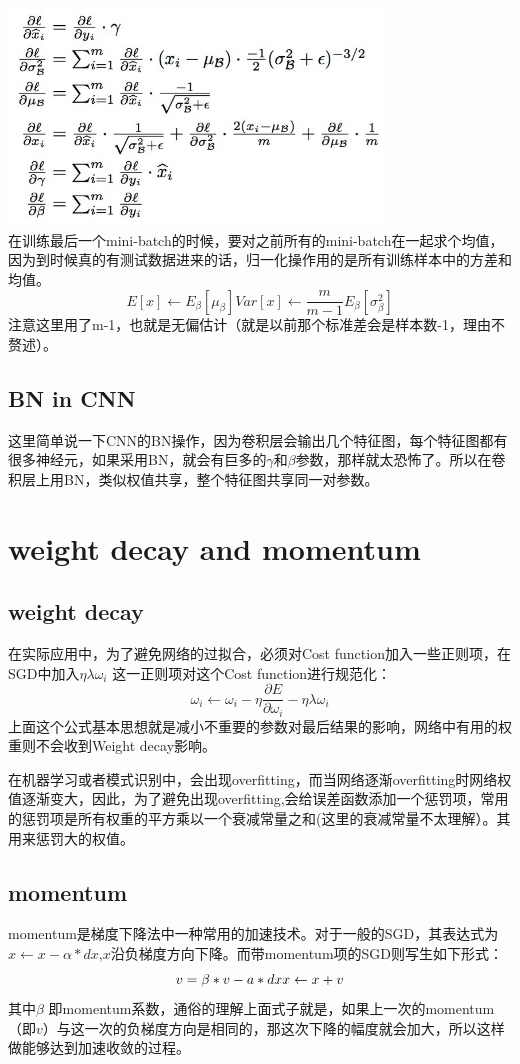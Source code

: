 \documentclass{article}
\begin{document}
\includegraphics[width=10cm]{chain}\\
在训练最后一个mini-batch的时候，要对之前所有的mini-batch在一起求个均值，因为到时候真的有测试数据进来的话，归一化操作用的是所有训练样本中的方差和均值。
$$
E[x] \leftarrow E_{\beta}[\mu_{\beta}]
Var[x] \leftarrow \frac{m}{m-1}E_{\beta}[\sigma^{2}_{\beta}]
$$
注意这里用了m-1，也就是无偏估计（就是以前那个标准差会是样本数-1，理由不赘述）。

\subsection{BN in CNN}
这里简单说一下CNN的BN操作，因为卷积层会输出几个特征图，每个特征图都有很多神经元，如果采用BN，就会有巨多的$\gamma$和$\beta$参数，那样就太恐怖了。所以在卷积层上用BN，类似权值共享，整个特征图共享同一对参数。


\section{weight decay and momentum}
\subsection{weight decay}
在实际应用中，为了避免网络的过拟合，必须对Cost function加入一些正则项，在SGD中加入$\eta \lambda \omega _{i}$ 这一正则项对这个Cost function进行规范化：
$$
\omega_{i}\leftarrow  \omega_{i} - \eta \frac{\partial E}{\partial \omega_{i}} - \eta \lambda \omega _{i}
$$
上面这个公式基本思想就是减小不重要的参数对最后结果的影响，网络中有用的权重则不会收到Weight decay影响。

在机器学习或者模式识别中，会出现overfitting，而当网络逐渐overfitting时网络权值逐渐变大，因此，为了避免出现overfitting,会给误差函数添加一个惩罚项，常用的惩罚项是所有权重的平方乘以一个衰减常量之和(这里的衰减常量不太理解）。其用来惩罚大的权值。

\subsection{momentum}
momentum是梯度下降法中一种常用的加速技术。对于一般的SGD，其表达式为$x \leftarrow  x-\alpha \ast dx$,$x$沿负梯度方向下降。而带momentum项的SGD则写生如下形式：
$$
v=\beta \ast v -a\ast dx\\
x \leftarrow  x+v
$$
其中$\beta$ 即momentum系数，通俗的理解上面式子就是，如果上一次的momentum（即$v$）与这一次的负梯度方向是相同的，那这次下降的幅度就会加大，所以这样做能够达到加速收敛的过程。
\end{document}
